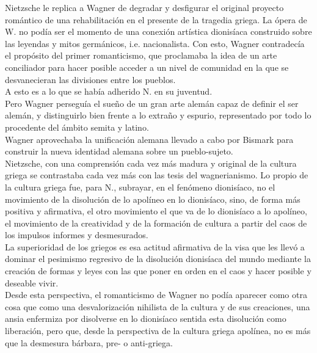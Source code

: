 \documentclass[a4paper, 10pt, twocolumn, spanish]{article}
\begin{document}
Nietzsche le replica a Wagner de degradar y desfigurar el original
proyecto romántico de una rehabilitación en el presente de la tragedia
griega. La ópera de W. no podía ser el momento de una conexión
artística dionisíaca construido sobre las leyendas y mitos germánicos,
i.e. nacionalista. Con esto, Wagner contradecía el propósito del
primer romanticismo, que proclamaba la idea de un arte conciliador
para hacer posible acceder a un nivel de comunidad en la que se
desvanecieran las divisiones entre los pueblos.\\[0pt]
A esto es a lo que se había adherido N. en su juventud.\\[0pt]
Pero Wagner perseguía el sueño de un gran arte alemán capaz de definir
el ser alemán, y distinguirlo bien frente a lo extraño y espurio,
representado por todo lo procedente del ámbito semita y latino.\\[0pt]
Wagner aprovechaba la unificación alemana llevado a cabo por Bismark
para construir la nueva identidad alemana sobre un pueblo-sujeto.\\[0pt]

Nietzsche, con una comprensión cada vez más madura y original de la
cultura griega se contrastaba cada vez más con las tesis del
wagnerianismo. Lo propio de la cultura griega fue, para N., subrayar,
en el fenómeno dionisíaco, no el movimiento de la disolución de lo
apolíneo en lo dionisíaco, sino, de forma más positiva y afirmativa,
el otro movimiento el que va de lo dionisíaco a lo apolíneo, el
movimiento de la creatividad y de la formación de cultura a partir del
caos de los impulsos informes y desmesurados.\\[0pt]
La superioridad de los griegos es esa actitud afirmativa de la visa
que les llevó a dominar el pesimismo regresivo de la disolución
dionisíaca del mundo mediante la creación de formas y leyes con las
que poner en orden en el caos y hacer posible y deseable vivir.\\[0pt]
Desde esta perspectiva, el romanticismo de Wagner no podía aparecer
como otra cosa que como una desvalorización nihilista de la cultura y
de sus creaciones, una ansia enfermiza por disolverse en lo dionisíaco
sentida esta disolución como liberación, pero que, desde la
perspectiva de la cultura griega apolínea, no es más que la desmesura
bárbara, pre- o anti-griega.\\[0pt]
\end{document}
